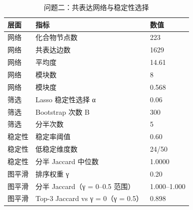 \begin{table}[tbp]
\centering
\caption{问题二：共表达网络与稳定性选择}
\label{tab:t05_q2_network}
\footnotesize
\setlength{\tabcolsep}{3.5pt}
\begin{tabular}{lll}
\toprule
层面 & 指标 & 数值 \\
\midrule
网络 & 化合物节点数 & 223 \\
网络 & 共表达边数 & 1629 \\
网络 & 平均度 & 14.61 \\
网络 & 模块数 & 8 \\
网络 & 模块度 & 0.568 \\
筛选 & Lasso 稳定性选择 α & 0.06 \\
筛选 & Bootstrap 次数 B & 300 \\
筛选 & 分半次数 & 5 \\
稳定性 & 稳定率阈值 & 0.60 \\
稳定性 & 低稳定维度数 & 24/50 \\
稳定性 & 分半 Jaccard 中位数 & 1.0000 \\
图平滑 & 排序权重 γ & 0.20 \\
图平滑 & 分半 Jaccard（γ = 0–0.5 范围） & 1.000–1.000 \\
图平滑 & Top-3 Jaccard vs γ = 0（γ = 0.5） & 0.898 \\
\bottomrule
\end{tabular}
\end{table}
